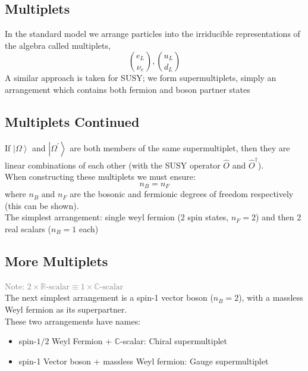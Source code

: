 \documentclass{beamer}
\begin{document}
\subsection{Multiplets}
\begin{frame}{\insertsubsection}
In the standard model we arrange particles into the \alert{irriducible
representations} of the
algebra called multiplets,
  \begin{equation*}
    \binom{e_L}{\nu_{e}},\binom{u_{L}}{d_{L}}
  \end{equation*}
A similar approach is taken for SUSY; we form \alert{supermultiplets}, simply an
arrangement which contains both fermion and boson partner states
\end{frame}

\subsection{Multiplets Continued}
\begin{frame}{\insertsubsection}
  If $\left|\Omega\right>$ and $\left|\Omega^{\prime}\right>$ are both members of
  the same supermultiplet, then they are linear combinations of each other (with
  the SUSY operator $\hat{O}$ and $\hat{O}^{\dagger}$).
  \\ When constructing these multiplets we must ensure:
  \begin{equation*}
    n_{B}=n_{F}
  \end{equation*}
  where $n_{B}$ and $n_{F}$ are the bosonic and fermionic degrees of freedom
  respectively (this can be shown).
\\
  \alert{The simplest arrangement: single weyl fermion (2 spin states, $n_{F}=2$) and
  then 2 real scalars ($n_{B}=1$ each)}
\end{frame}

\subsection{More Multiplets}
\begin{frame}{\insertsubsection}
\textcolor{gray}{Note:
$2\times\mathbb{R}\textrm{-scalar}\equiv1\times\mathbb{C}\textrm{-scalar}$}\\
  The next simplest arrangement is a spin-1 vector boson ($n_{B}=2$), with a
  massless Weyl fermion as its superpartner.
  \\
  These two arrangements have names:
  \begin{itemize}
    \item spin-$1/2$ Weyl Fermion + $\mathbb{C}$-scalar: \alert{Chiral
    supermultiplet}
    \item spin-1 Vector boson + massless Weyl fermion: \alert{Gauge
    supermultiplet}
  \end{itemize}
\end{frame}
\end{document}
